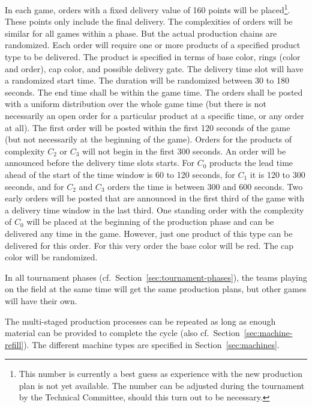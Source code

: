\documentclass[12pt,twoside]{article}
\newcommand{\refsec}[1]{Section~\ref{#1}}
\begin{document}
In each game, orders with a fixed delivery value of 160 points will be
placed\footnote{This number is currently a best guess as experience
  with the new production plan is not yet available. The number can be
  adjusted during the tournament by the Technical Committee, should
  this turn out to be necessary.}. These points only include the final
delivery. The complexities of orders will be similar for all games
within a phase. But the actual production chains are randomized. Each
order will require one or more products of a specified product type to
be delivered. The product is specified in terms of base color, rings
(color and order), cap color, and possible delivery gate. The delivery
time slot will have a randomized start time. The duration will be
randomized between 30 to 180 seconds. The end time shall be within the
game time. The orders shall be posted with a uniform distribution over
the whole game time (but there is not necessarily an open order for a
particular product at a specific time, or any order at all). The first
order will be posted within the first 120 seconds of the game (but not
necessarily at the beginning of the game). Orders for the products of
complexity $C_2$ or $C_3$ will not begin in the first 300 seconds. An
order will be announced before the delivery time slots starts. For
$C_0$ products the lead time ahead of the start of the time window is
60 to 120 seconds, for $C_1$ it is 120 to 300 seconds, and for $C_2$
and $C_3$ orders the time is between 300 and 600 seconds. Two early
orders will be posted that are announced in the first third of the
game with a delivery time window in the last third. One standing order
with the complexity of $C_0$ will be placed at the beginning of the
production phase and can be delivered any time in the game. However,
just one product of this type can be delivered for this order. For
this very order the base color will be red. The cap color will be
randomized.

In all tournament phases (cf.~\refsec{sec:tournament-phases}), the
teams playing on the field at the same time will get the same
production plans, but other games will have their own.

The multi-staged production processes can be repeated as long as
enough material can be provided to complete the cycle (also
cf.~\refsec{sec:machine-refill}). The different machine types are
specified in Section~\ref{sec:machines}.
\end{document}
